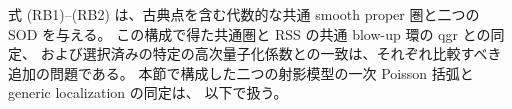\begin{remark}
式 (RB1)--(RB2) は、古典点を含む代数的な共通 smooth proper 圏と二つの SOD を与える。
この構成で得た共通圏と RSS の共通 blow-up 環の qgr との同定、
および選択済みの特定の高次量子化係数との一致は、それぞれ比較すべき追加の問題である。
本節で構成した二つの射影模型の一次 Poisson 括弧と generic localization の同定は、
以下で扱う。
\end{remark}
